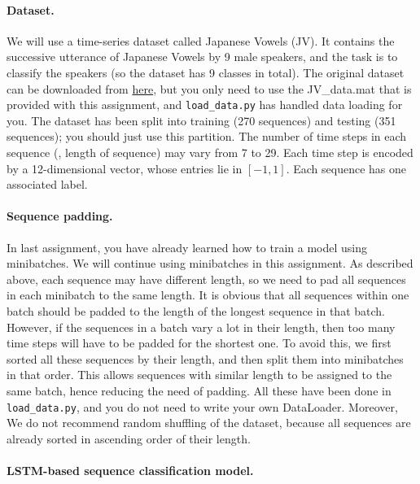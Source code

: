 \documentclass[11pt]{report}
\begin{document}
\paragraph{Dataset.}

We will use a time-series dataset called Japanese Vowels (JV).
It contains the successive utterance of Japanese Vowels by 9 male speakers, 
and the task is to classify the speakers 
(so the dataset has 9 classes in total). 
The original dataset can be downloaded from \href{https://archive.ics.uci.edu/ml/datasets/Japanese+Vowels}{here},
but you only need to use the JV\_data.mat that is provided with this assignment,
and \texttt{load\_data.py} has handled data loading for you.
The dataset has been split into training (270 sequences) and testing (351 sequences); you should just use this partition. 
The number of time steps in each sequence (\ie, length of sequence) may vary from 7 to 29. 
Each time step is encoded by a 12-dimensional vector, 
whose entries lie in $[-1,1]$. 
Each sequence has one associated label.




\paragraph{Sequence padding.}
\label{par:padding}
In last assignment, you have already learned how to train a model using minibatches. 
We will continue using minibatches in this assignment. 
As described above, each sequence may have different length, 
so we need to pad all sequences in each minibatch to the same length. It is obvious that all sequences within one batch should be padded to the length of the longest sequence in that batch. 
However, if the sequences in a batch vary a lot in their length,
then too many time steps will have to be padded for the shortest one. 
To avoid this, we first sorted all these sequences by their length, 
and then split them into minibatches in that order. 
This allows sequences with similar length to be assigned to the same batch, hence reducing the need of padding. 
All these have been done in \texttt{load\_data.py}, 
and you do not need to write your own DataLoader. 
Moreover, We do not recommend random shuffling of the dataset, 
because all sequences are already sorted in ascending order of their length.


\paragraph{LSTM-based sequence classification model.}
\label{sec:LSTM}
\end{document}
